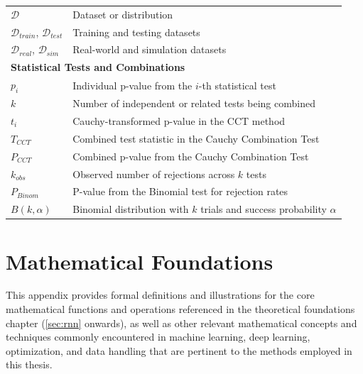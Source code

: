 \begin{appendices}
\begin{longtable}{p{}p{}}
    \midrule
    $\mathcal{D}$                               & Dataset or distribution                                                              \\
    $\mathcal{D}_{train}$, $\mathcal{D}_{test}$ & Training and testing datasets                                                        \\
    $\mathcal{D}_{real}$, $\mathcal{D}_{sim}$   & Real-world and simulation datasets                                                   \\
    \midrule
    \multicolumn{2}{l}{\textbf{Statistical Tests and Combinations}}                                                                    \\
    \midrule
    $p_i$                                       & Individual p-value from the $i$-th statistical test                                  \\
    $k$                                         & Number of independent or related tests being combined                                \\
    $t_i$                                       & Cauchy-transformed p-value in the CCT method                                         \\
    $T_{CCT}$                                   & Combined test statistic in the Cauchy Combination Test                               \\
    $P_{CCT}$                                   & Combined p-value from the Cauchy Combination Test                                    \\
    $k_{obs}$                                   & Observed number of rejections across $k$ tests                                       \\
    $P_{Binom}$                                 & P-value from the Binomial test for rejection rates                                   \\
    $B(k, \alpha)$                              & Binomial distribution with $k$ trials and success probability $\alpha$               \\
  \end{longtable}
  \endgroup

  \section{Mathematical Foundations}
  \label{app:math_foundations}

  This appendix provides formal definitions and illustrations for the core mathematical functions and operations referenced in the theoretical foundations chapter (\autoref{sec:rnn} onwards), as well as other relevant mathematical concepts and techniques commonly encountered in machine learning, deep learning, optimization, and data handling that are pertinent to the methods employed in this thesis.



\end{appendices}
